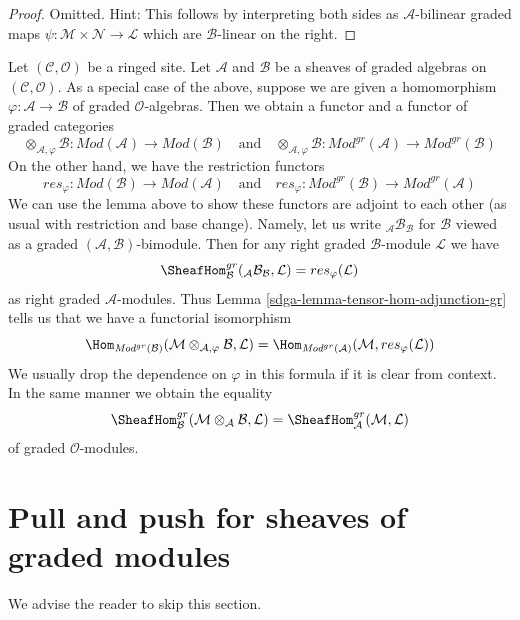\begin{proof}
Omitted. Hint: This follows by interpreting both sides as
$\mathcal{A}$-bilinear graded maps
$\psi : \mathcal{M} \times \mathcal{N} \to \mathcal{L}$
which are $\mathcal{B}$-linear on the right.
\end{proof}

Let $(\mathcal{C}, \mathcal{O})$ be a ringed site. Let $\mathcal{A}$
and $\mathcal{B}$ be a sheaves of graded algebras on
$(\mathcal{C}, \mathcal{O})$.
As a special case of the above, suppose we are given
a homomorphism $\varphi : \mathcal{A} \to \mathcal{B}$
of graded $\mathcal{O}$-algebras. Then we obtain a functor
and a functor of graded categories
$$
\otimes_{\mathcal{A}, \varphi} \mathcal{B} :
\textit{Mod}(\mathcal{A})
\longrightarrow
\textit{Mod}(\mathcal{B})
\quad\text{and}\quad
\otimes_{\mathcal{A}, \varphi} \mathcal{B} :
\textit{Mod}^{gr}(\mathcal{A})
\longrightarrow
\textit{Mod}^{gr}(\mathcal{B})
$$
On the other hand, we have the restriction functors
$$
res_\varphi :
\textit{Mod}(\mathcal{B})
\longrightarrow
\textit{Mod}(\mathcal{A})
\quad\text{and}\quad
res_\varphi :
\textit{Mod}^{gr}(\mathcal{B})
\longrightarrow
\textit{Mod}^{gr}(\mathcal{A})
$$
We can use the lemma above to show these functors are adjoint to
each other (as usual with restriction and base change). Namely,
let us write ${}_\mathcal{A}\mathcal{B}_\mathcal{B}$ for
$\mathcal{B}$ viewed as a graded $(\mathcal{A}, \mathcal{B})$-bimodule.
Then for any right graded $\mathcal{B}$-module $\mathcal{L}$
we have
$$
\SheafHom_\mathcal{B}^{gr}({}_\mathcal{A}\mathcal{B}_\mathcal{B}, \mathcal{L})
= res_\varphi(\mathcal{L})
$$
as right graded $\mathcal{A}$-modules. Thus
Lemma \ref{sdga-lemma-tensor-hom-adjunction-gr}
tells us that we have a functorial isomorphism
$$
\Hom_{\textit{Mod}^{gr}(\mathcal{B})}(
\mathcal{M} \otimes_{\mathcal{A}, \varphi} \mathcal{B}, \mathcal{L}) =
\Hom_{\textit{Mod}^{gr}(\mathcal{A})}(
\mathcal{M}, res_\varphi(\mathcal{L}))
$$
We usually drop the dependence on $\varphi$ in this formula if it
is clear from context. In the same manner we obtain
the equality
$$
\SheafHom^{gr}_\mathcal{B}(
\mathcal{M} \otimes_\mathcal{A} \mathcal{B}, \mathcal{L}) =
\SheafHom_\mathcal{A}^{gr}(\mathcal{M}, \mathcal{L})
$$
of graded $\mathcal{O}$-modules.

\section{Pull and push for sheaves of graded modules}
\label{sdga-section-functoriality-graded}
We advise the reader to skip this section.

